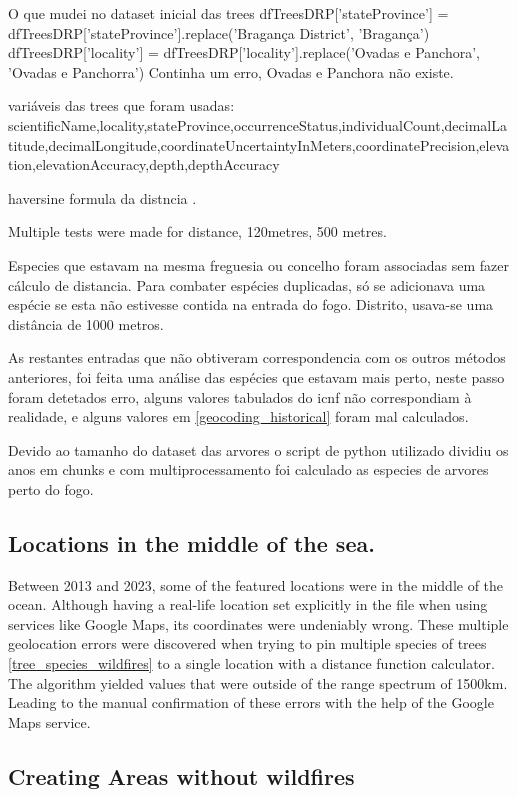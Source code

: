 O que mudei no dataset inicial das trees
dfTreesDRP['stateProvince'] = dfTreesDRP['stateProvince'].replace('Bragança District', 'Bragança')
dfTreesDRP['locality'] = dfTreesDRP['locality'].replace('Ovadas e Panchora', 'Ovadas e Panchorra')
Continha um erro, Ovadas e Panchora não existe.


variáveis das trees que foram usadas: scientificName,locality,stateProvince,occurrenceStatus,individualCount,decimalLatitude,decimalLongitude,coordinateUncertaintyInMeters,coordinatePrecision,elevation,elevationAccuracy,depth,depthAccuracy


haversine formula da distncia \cite{esri2024}.


Multiple tests were made for distance, 120metres, 500 metres.

Especies que estavam na mesma freguesia ou concelho foram associadas sem fazer cálculo de distancia. Para combater espécies duplicadas, só se adicionava uma espécie se esta não estivesse contida na entrada do fogo.
Distrito, usava-se uma distância de 1000 metros.

As restantes entradas que não obtiveram correspondencia com os outros métodos anteriores, foi feita uma análise das espécies que estavam mais perto, neste passo foram detetados erro, alguns valores tabulados do icnf não correspondiam à realidade, e alguns valores em \ref{geocoding_historical} foram mal calculados.

Devido ao tamanho do dataset das arvores o script de python utilizado dividiu os anos em chunks e com multiprocessamento foi calculado as especies de arvores perto do fogo.


\subsection{Locations in the middle of the sea.}
Between 2013 and 2023, some of the featured locations were in the middle of the ocean. Although having a real-life location set explicitly in the file when using services like Google Maps, its coordinates were undeniably wrong. These multiple geolocation errors were discovered when trying to pin multiple species of trees \ref{tree_species_wildfires} to a single location with a distance function calculator. The algorithm yielded values that were outside of the range spectrum of 1500km. Leading to the manual confirmation of these errors with the help of the Google Maps service.



\subsection{Creating Areas without wildfires}

